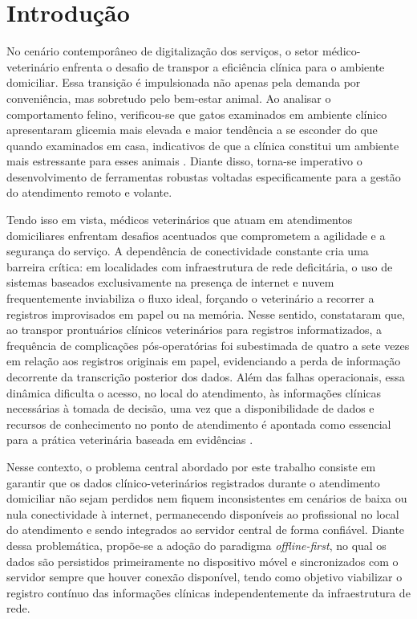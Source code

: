 \chapter{Introdução}
\label{cap:introducao}


No cenário contemporâneo de digitalização dos serviços, o setor médico-veterinário enfrenta o desafio de transpor a eficiência clínica para o ambiente domiciliar. Essa transição é impulsionada não apenas pela demanda por conveniência, mas sobretudo pelo bem-estar animal. Ao analisar o comportamento felino, verificou-se que gatos examinados em ambiente clínico apresentaram glicemia mais elevada e maior tendência a se esconder do que quando examinados em casa, indicativos de que a clínica constitui um ambiente mais estressante para esses animais \cite[p.~68]{nibblett2015}. Diante disso, torna-se imperativo o desenvolvimento de ferramentas robustas voltadas especificamente para a gestão do atendimento remoto e volante.

Tendo isso em vista, médicos veterinários que atuam em atendimentos domiciliares enfrentam desafios acentuados que comprometem a agilidade e a segurança do serviço. A dependência de conectividade constante cria uma barreira crítica: em localidades com infraestrutura de rede deficitária, o uso de sistemas baseados exclusivamente na presença de internet e nuvem frequentemente inviabiliza o fluxo ideal, forçando o veterinário a recorrer a registros improvisados em papel ou na memória. Nesse sentido,  constataram que, ao transpor prontuários clínicos veterinários para registros informatizados, a frequência de complicações pós-operatórias foi subestimada de quatro a sete vezes em relação aos registros originais em papel, evidenciando a perda de informação decorrente da transcrição posterior dos dados. Além das falhas operacionais, essa dinâmica dificulta o acesso, no local do atendimento, às informações clínicas necessárias à tomada de decisão, uma vez que a disponibilidade de dados e recursos de conhecimento no ponto de atendimento é apontada como essencial para a prática veterinária baseada em evidências \cite{alpi2011}.

Nesse contexto, o problema central abordado por este trabalho consiste em garantir que os dados clínico-veterinários registrados durante o atendimento domiciliar não sejam perdidos nem fiquem inconsistentes em cenários de baixa ou nula conectividade à internet, permanecendo disponíveis ao profissional no local do atendimento e sendo integrados ao servidor central de forma confiável. Diante dessa problemática, propõe-se a adoção do paradigma \textit{offline-first}, no qual os dados são persistidos primeiramente no dispositivo móvel e sincronizados com o servidor sempre que houver conexão disponível, tendo como objetivo viabilizar o registro contínuo das informações clínicas independentemente da infraestrutura de rede.

